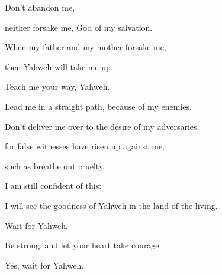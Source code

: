 {\par }{\QB Don’t abandon me,
\par }{\QB neither forsake me, God of my salvation.
\par }{\Q {}When my father and my mother forsake me,
\par }{\QB then Yahweh will take me up.
\par }{\Q {}Teach me your way, Yahweh.
\par }{\QB Lead me in a straight path, because of my enemies.
\par }{\Q {}Don’t deliver me over to the desire of my adversaries,
\par }{\QB for false witnesses have risen up against me,
\par }{\QB such as breathe out cruelty.
\par }{\Q {}I am still confident of this:
\par }{\QB I will see the goodness of Yahweh in the land of the living.
\par }{\Q {}Wait for Yahweh.
\par }{\QB Be strong, and let your heart take courage.
\par }{\Q Yes, wait for Yahweh.

}
